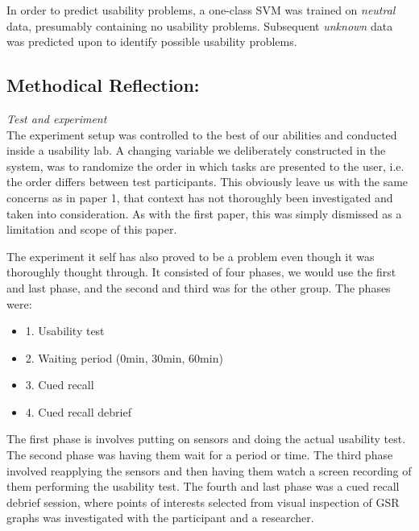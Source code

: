 In order to predict usability problems, a one-class SVM was trained on \textit{neutral} data, presumably containing no
usability problems. Subsequent \textit{unknown} data was predicted upon to identify possible usability problems.


\subsection{Methodical Reflection:}
\textit{Test and experiment}\\
The experiment setup was controlled to the best of our abilities and conducted inside a usability lab. A changing
variable we deliberately constructed in the system, was to randomize the order in which tasks are presented to the user,
i.e. the order differs between test participants.
This obviously leave us with the same concerns as in paper 1, that context has not thoroughly been investigated and taken
into consideration. As with the first paper, this was simply dismissed as a limitation and scope of this paper.

The experiment it self has also proved to be a problem even though it was thoroughly thought through. 
It consisted of four phases, we would use the first and last phase, and the second and third was for the other group. The phases were:

\begin{itemize}
\item 1. Usability test
\item 2. Waiting period (0min, 30min, 60min)
\item 3. Cued recall
\item 4. Cued recall debrief
\end{itemize}

The first phase is involves putting on sensors and doing the actual usability test. The second phase was having them wait for a period or time. 
The third phase involved reapplying the sensors and then having them watch a screen recording of them performing the usability test.
The fourth and last phase was a cued recall debrief session, where points of interests selected from visual inspection of GSR graphs was investigated with the participant and a researcher.

